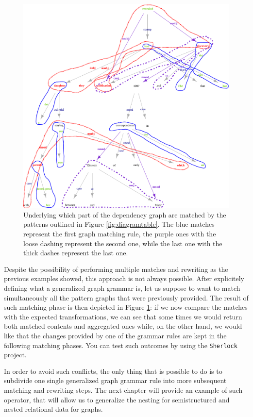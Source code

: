\begin{figure}[!pth]
	\centering
	\includegraphics[width=\textwidth]{fig/05language/01DependencyGraph_match}
	\caption{Underlying which part of the dependency graph are matched by the patterns outlined in Figure \vref{fig:diagramtable}. The blue matches represent the first graph matching rule, the purple ones with the loose dashing represent the second one, while the last one with the thick dashes represent the last one.}
	\label{fig:dependencygraph_matches}
\end{figure}


\begin{example}
Despite the possibility of performing multiple matches and rewriting as the previous examples showed, this approach is not always possible. After explicitely defining what a generalized graph grammar is, let us suppose to want to match simultaneously all the pattern graphs that were previously provided. The result of such matching phase is then depicted in Figure \ref{fig:dependencygraph_matches}: if we now compare the matches with the expected transformations, we can see that some times we would return both matched contents and aggregated ones while, on the other hand, we would like that the changes provided by one of the grammar rules are kept in the following matching phases. You can test such outcomes by using the \texttt{Sherlock} project.

In order to avoid such conflicts, the only thing that is possible to do is to subdivide one single generalized graph grammar rule into more subsequent matching and rewriting steps. The next chapter will provide an example of such operator, that will allow us to generalize the nesting for semistructured and nested relational data for graphs. 
\end{example}
